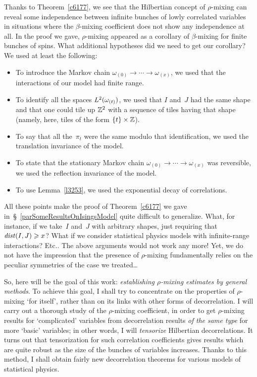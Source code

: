 Thanks to Theorem~\ref{c6177}, we see that the Hilbertian concept of $\rho$-mixing
can reveal some independence between infinite bunches of lowly correlated variables
in situations where the $\beta$-mixing coefficient does not show any independence at all.
In the proof we gave, $\rho$-mixing appeared as a corollary
of $\beta$-mixing for finite bunches of spins.
What additional hypotheses did we need to get our corollary?
We used at least the following:
%
\begin{itemize}
\item To introduce the Markov chain $\omega_{(0)} \to \cdots \to \omega_{(x)}$,
we used that the interactions of our model had finite range.
\item To identify all the spaces $\ldb(\omega_{(t)})$,
we used that $I$ and~$J$ had the same shape and that one could tile up $\mathbb{Z}^2$
with a sequence of tiles having that shape (namely, here, tiles of the form $\{t\}\times\mathbb{Z}$).
\item To say that all the~$\pi_t$ were the same modulo that identification,
we used the translation invariance of the model.
\item To state that the stationary Markov chain $\omega_{(0)} \to \cdots \to \omega_{(x)}$
was reversible, we used the reflection invariance of the model.
\item To use Lemma~\ref{l3253}, we used the exponential decay of correlations.
\end{itemize}
%
All these points make the proof of Theorem~\ref{c6177} we gave
in~\S~\ref{parSomeResultsOnIsingsModel} quite difficult to generalize.
What, for instance, if we take~$I$ and~$J$ with arbitrary shapes,
just requiring that $\mathit{dist}(I,J) \geqslant x$?
What if we consider statistical physics models with infinite-range interactions? Etc..
The above arguments would not work any more! Yet, we do not have the impression that
the presence of $\rho$-mixing fundamentally relies
on the peculiar symmetries of the case we treated\dots

So, here will be the goal of this work:
\emph{establishing $\rho$-mixing estimates by general methods}.
To achieve this goal, I shall try to concentrate on the properties of $\rho$-mixing
`for itself', rather than on its links with other forms of decorrelation.
I will carry out a thorough study of the $\rho$-mixing coefficient,
in order to get $\rho$-mixing results for `complicated' variables
from decorrelation results \emph{of the same type} for more `basic' variables;
in other words, I will \emph{tensorize} Hilbertian decorrelations.
It turns out that tensorization for such correlation coefficients gives results which are
quite robust as the size of the bunches of variables increases.
Thanks to this method, I shall obtain fairly new decorrelation theorems
for various models of statistical physics.

